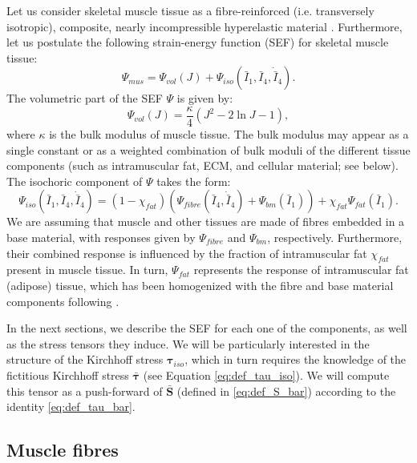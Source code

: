 \documentclass{sfuthesis}
\numberwithin{equation}{section}
\numberwithin{figure}{chapter}
\numberwithin{table}{chapter}
\theoremstyle{definition}
\def\*#1{{\mathbf{#1}}} %
\newcommand{\I}{{\bar{I}}}
\def\btau{{\bm{\tau}}}
\begin{document}
Let us consider skeletal muscle tissue as a fibre-reinforced (i.e. transversely isotropic), composite, nearly incompressible hyperelastic material \cite{Seba, Hadi, Paper1_WakelingEtAl2020}. Furthermore, let us postulate the following strain-energy function (SEF) for skeletal muscle tissue:
\begin{equation}
    \Psi_{mus} = \Psi_{vol}(J) + \Psi_{iso}(\I_1, \I_4, \dot{\I}_4).
\end{equation}
The volumetric part of the SEF $\Psi$ is given by:
\begin{equation} \label{eq:def_Psi_vol}
    \Psi_{vol}(J) = \dfrac{\kappa}{4} \left( J^2 - 2\ln J - 1 \right),
\end{equation}
where $\kappa$ is the bulk modulus of muscle tissue. The bulk modulus may appear as a single constant or as a weighted combination of bulk moduli of the different tissue components (such as intramuscular fat, ECM, and cellular material; see below). The isochoric component of $\Psi$ takes the form:
\begin{equation} \label{eq:def_Psi_iso_fibre_bm_fat}
    \Psi_{iso}(\I_1, \I_4, \dot{\I}_4) = (1-\chi_{fat}) \left( \Psi_{fibre}(\I_4, \dot{\I}_4) + \Psi_{bm}(\I_1) \right) + \chi_{fat} \Psi_{fat}(\I_1).
\end{equation}
We are assuming that muscle and other tissues are made of fibres embedded in a base material, with responses given by $\Psi_{fibre}$ and $\Psi_{bm}$, respectively. Furthermore, their combined response is influenced by the fraction of intramuscular fat $\chi_{fat}$ present in muscle tissue. In turn, $\Psi_{fat}$ represents the response of intramuscular fat (adipose) tissue, which has been homogenized with the fibre and base material components following \cite[Model M4]{RahemiNigamWakeling2015}.

In the next sections, we describe the SEF for each one of the components, as well as the stress tensors they induce. We will be particularly interested in the structure of the Kirchhoff stress $\btau_{iso}$, which in turn requires the knowledge of the fictitious Kirchhoff stress $\bar{\btau}$ (see Equation \eqref{eq:def_tau_iso}). We will compute this tensor as a push-forward of $\bar{\*S}$ (defined in \eqref{eq:def_S_bar}) according to the identity \eqref{eq:def_tau_bar}.

\subsection{Muscle fibres}
\end{document}
